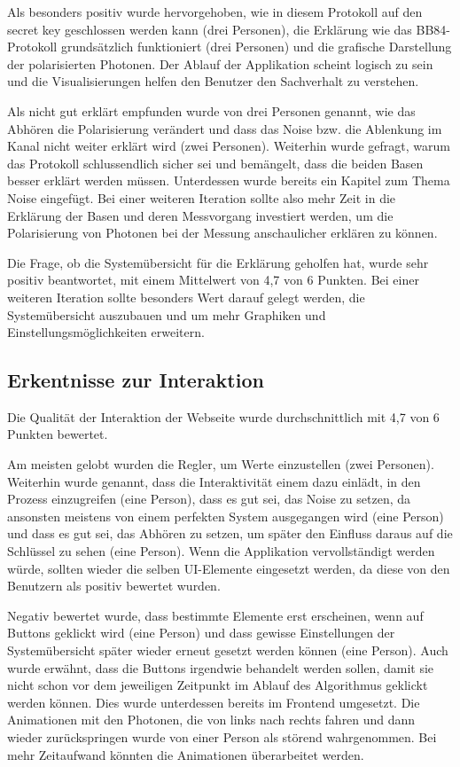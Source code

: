 \documentclass[a4paper,10.2pt,pdftex]{scrartcl}%
\begin{document}
Als besonders positiv wurde  hervorgehoben, wie in diesem Protokoll auf den secret key geschlossen werden kann (drei Personen), die Erklärung wie das BB84-Protokoll grundsätzlich funktioniert (drei Personen) und die grafische Darstellung der polarisierten Photonen. Der Ablauf der Applikation scheint logisch zu sein und die Visualisierungen helfen den Benutzer den Sachverhalt zu verstehen.

Als nicht gut erklärt empfunden wurde von drei Personen genannt, wie das Abhören die Polarisierung verändert und dass das Noise bzw. die Ablenkung im Kanal nicht weiter erklärt wird (zwei Personen). Weiterhin wurde gefragt, warum das Protokoll schlussendlich sicher sei und bemängelt, dass die beiden Basen besser erklärt werden müssen. Unterdessen wurde bereits ein Kapitel zum Thema Noise eingefügt. Bei einer weiteren Iteration sollte also mehr Zeit in die Erklärung der Basen und deren Messvorgang investiert werden, um die Polarisierung von Photonen bei der Messung anschaulicher erklären zu können.

Die Frage, ob die Systemübersicht für die Erklärung geholfen hat, wurde sehr positiv beantwortet, mit einem Mittelwert von 4,7 von 6 Punkten. Bei einer weiteren Iteration sollte besonders Wert darauf gelegt werden, die Systemübersicht auszubauen und um mehr Graphiken und Einstellungsmöglichkeiten erweitern. 
\subsection{Erkentnisse zur Interaktion}
Die Qualität der Interaktion der Webseite wurde durchschnittlich mit 4,7 von 6 Punkten bewertet.

Am meisten gelobt wurden die Regler, um Werte einzustellen (zwei Personen). Weiterhin wurde genannt, dass die Interaktivität einem dazu einlädt, in den Prozess einzugreifen (eine Person), dass es gut sei, das Noise zu setzen, da ansonsten meistens von einem perfekten System ausgegangen wird (eine Person) und dass es gut sei, das Abhören zu setzen, um später den Einfluss daraus auf die Schlüssel zu sehen (eine Person). Wenn die Applikation vervollständigt werden würde, sollten wieder die selben UI-Elemente eingesetzt werden, da diese von den Benutzern als positiv bewertet wurden.

Negativ bewertet wurde, dass bestimmte Elemente erst erscheinen, wenn auf Buttons geklickt wird (eine Person) und dass gewisse Einstellungen der Systemübersicht später wieder erneut gesetzt werden können (eine Person). Auch wurde erwähnt, dass die Buttons irgendwie behandelt werden sollen, damit sie nicht schon vor dem jeweiligen Zeitpunkt im Ablauf des Algorithmus geklickt werden können. Dies wurde unterdessen bereits im Frontend umgesetzt. Die Animationen mit den Photonen, die von links nach rechts fahren und dann wieder zurückspringen wurde von einer Person als störend wahrgenommen. Bei mehr Zeitaufwand könnten die Animationen überarbeitet werden.
\end{document}
